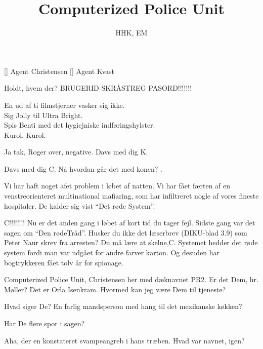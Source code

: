 \documentclass[a4paper,11pt]{article}
\title{Computerized Police Unit}
\author{HHK, EM}
\begin{document}
\maketitle

\begin{roles}
[] Agent Christensen
[] Agent Kvast
\end{roles}


\begin{sketch}


 Holdt, hvem der? BRUGERID SKRÅSTREG PASORD!!!!!!!

 En ud af ti filmstjerner vasker sig ikke.\\
Sig Jolly til Ultra Bright.\\
Spis Benti med det hygiejniske indføringshylster.\\
Kurol. Kurol.

 Ja tak, Roger over, negative. Davs med dig K.

 Davs med dig C. Nå hvordan går det med konen? .

 Vi har haft noget afet problem i løbet af natten. Vi har fået færten af
en venstreorienteret multinational mafiaring, som har infiltreret nogle af vores
fineste hospitaler. De kalder sig vist ``Det røde System''.

 C!!!!!!!! Nu er det anden gang i løbet af kort tid du tager
fejl. Sidste gang var det sagen om ``Den rødeTråd''. Husker du ikke det
læserbrev (DIKU-blad 3.9) som Peter Naur skrev fra arresten? Du må lære at
skelne,C. Systemet hedder det røde system fordi man var udgået for andre farver
karton. Og desuden har bogtrykkeren fået tolv år for spionage.


 Computerized Police Unit, Christensen her med dæknavnet PR2. Er det
Dem, hr. Møller?  Det er Orla Isenkram. Hvormed kan jeg være Dem til
tjeneste?

 Hvad siger De? En farlig mandsperson med hang til det mexikanske
køkken?

 Har De flere spor i sagen?

 Aha, der en konstateret svampeangreb i hans træben. Hvad var navnet,
igen?


\end{sketch}
\end{document}
